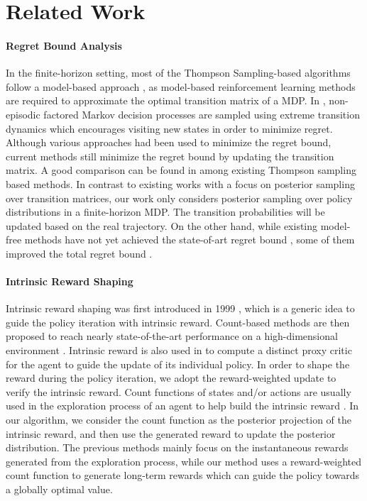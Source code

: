 \documentclass{article}
\theoremstyle{plain}
\theoremstyle{definition}
\theoremstyle{remark}
\begin{document}
\section{Related Work}

\paragraph{\bf Regret Bound Analysis} In the finite-horizon setting, most of the Thompson Sampling-based algorithms follow a model-based approach \citep{NIPS2013_4f284803,NEURIPS2020_d3b1fb02,NIPS2008_e4a6222c,https://doi.org/10.48550/arxiv.2007.05456,Dong2020QlearningWU,agarwal2020model}, as model-based reinforcement learning methods are required to approximate the optimal transition matrix of a MDP. In \citet{NEURIPS2020_d3b1fb02}, non-episodic factored Markov decision processes are sampled using extreme transition dynamics which encourages visiting new states in order to minimize regret. Although various approaches had been used to minimize the regret bound, current methods still minimize the regret bound by updating the transition matrix. A good comparison can be found in \citet{Zhang2021IsRL,wei2020model} among existing Thompson sampling based methods. In contrast to existing works with a focus on posterior sampling over transition matrices, our work only considers posterior sampling over policy distributions in a finite-horizon MDP. The transition probabilities will be updated based on the real trajectory. On the other hand, while existing model-free methods have not yet achieved the state-of-art regret bound \citep{NEURIPS2018_d3b1fb02,10.1145/1143844.1143955}, some of them improved the total regret bound \citep{4b7a722ffdac4ee19f43c307a35e8a94}.

\paragraph{\bf Intrinsic Reward Shaping} Intrinsic reward shaping was first introduced in 1999 \citep{ng1999policy}, which is a generic idea to guide the policy iteration with intrinsic reward. Count-based methods are then proposed to reach nearly state-of-the-art performance on a high-dimensional environment \citep{tang2017exploration}. Intrinsic reward is also used in \citet{du2019liir} to compute a distinct proxy critic for the agent to guide the update of its individual policy. In order to shape the reward during the policy iteration, we adopt the reward-weighted update to verify the intrinsic reward. Count functions of states and/or actions are usually used in the exploration process of an agent to help build the intrinsic reward \citep{tang2017exploration,bellemare2016unifying,burda2018large}. In our algorithm, we consider the count function as the posterior projection of the intrinsic reward, and then use the generated reward to update the posterior distribution. The previous methods mainly focus on the instantaneous rewards generated from the exploration process, while our method uses a reward-weighted count function to generate long-term rewards which can guide the policy towards a globally optimal value. 
\end{document}
